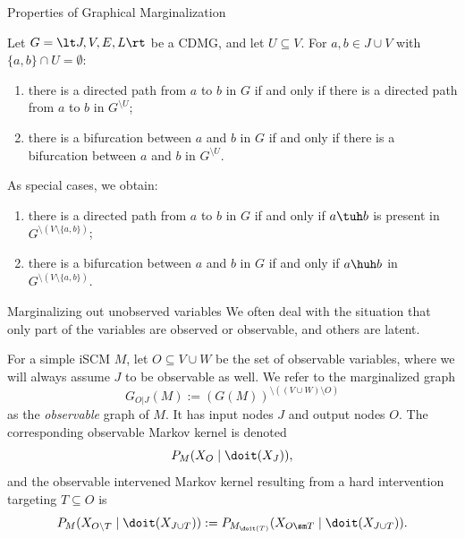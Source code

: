 \begin{frame}{Properties of Graphical Marginalization}
\begin{Prp}
  Let $G = \lt J, V, E, L \rt$ be a CDMG, and let $U \subseteq V$. For $a,b \in J \cup V$ with $\{a,b\} \cap U = \emptyset$:
\begin{enumerate}
  \item {\color{gray}there is a directed path from $a$ to $b$ in $G$ if and only if there is a directed path from $a$ to $b$ in $G^{\setminus U}$};
  \item there is a bifurcation between $a$ and $b$ in $G$ if and only if there is a bifurcation between $a$ and $b$ in $G^{\setminus U}$.
\end{enumerate}
\end{Prp}
\begin{Rem}
  As special cases, we obtain:
    \begin{enumerate}
      \item there is a directed path from $a$ to $b$ in $G$ if and only if $a \tuh b$ is present in $G^{\setminus (V\setminus\{a,b\})}$;
      \item there is a bifurcation between $a$ and $b$ in $G$ if and only if $a \huh b$ in $G^{\setminus (V\setminus\{a,b\})}$.
    \end{enumerate}
\end{Rem}
\end{frame}

\begin{frame}{Marginalizing out unobserved variables}
We often deal with the situation that only part of the variables are observed or observable, and others are latent.
\begin{Not}
\setlength\abovedisplayskip{5pt}
\setlength\belowdisplayskip{5pt}
For a simple iSCM $M$, let $O \subseteq V \cup W$ be the set of observable variables,
where we will always assume $J$ to be observable as well.
We refer to the marginalized graph
$$G_{O|J}(M) := (G(M))^{\setminus((V \cup W) \setminus O)}$$
as the \emph{observable} graph of $M$. It has input nodes $J$ and output nodes $O$.
The corresponding observable Markov kernel is denoted 
  $$P_{M}(X_O \mid \doit(X_J)),$$
and the observable intervened Markov kernel resulting from a hard intervention targeting $T \subseteq O$ is 
  $$P_{M}(X_{O\setminus T} \mid \doit(X_{J\cup T})) := P_{M_{\doit(T)}}(X_{O\sm T} \mid \doit(X_{J\cup T})).$$
\end{Not}
\end{frame}

